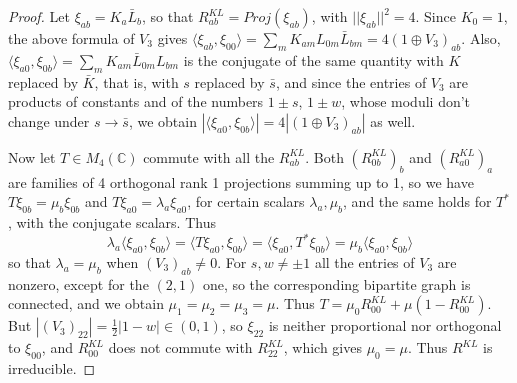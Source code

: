 \documentclass[11pt]{amsart}
\begin{document}
\begin{proof}
Let $\xi_{ab}=K_a\bar{L}_b$, so that $R^{KL}_{ab}=Proj(\xi_{ab})$, with $||\xi_{ab}||^2=4$. Since $K_0=1$, the above formula of $V_3$ gives $\langle\xi_{ab},\xi_{00}\rangle=\sum_mK_{am}L_{0m}\bar{L}_{bm}=4(1\oplus V_3)_{ab}$. Also, $\langle\xi_{a0},\xi_{0b}\rangle=\sum_mK_{am}\bar{L}_{0m}L_{bm}$ is the conjugate of the same quantity with $K$ replaced by $\bar{K}$, that is, with $s$ replaced by $\bar{s}$, and since the entries of $V_3$ are products of constants and of the numbers $1\pm s$, $1\pm w$, whose moduli don't change under $s\to\bar{s}$, we obtain $|\langle\xi_{a0},\xi_{0b}\rangle|=4|(1\oplus V_3)_{ab}|$ as well.

Now let $T\in M_4(\mathbb C)$ commute with all the $R^{KL}_{ab}$. Both $(R^{KL}_{0b})_b$ and $(R^{KL}_{a0})_a$ are families of 4 orthogonal rank 1 projections summing up to 1, so we have $T\xi_{0b}=\mu_b\xi_{0b}$ and $T\xi_{a0}=\lambda_a\xi_{a0}$, for certain scalars $\lambda_a,\mu_b$, and the same holds for $T^*$, with the conjugate scalars. Thus
$$\lambda_a\langle\xi_{a0},\xi_{0b}\rangle=\langle T\xi_{a0},\xi_{0b}\rangle=\langle\xi_{a0},T^*\xi_{0b}\rangle=\mu_b\langle\xi_{a0},\xi_{0b}\rangle$$
so that $\lambda_a=\mu_b$ when $(V_3)_{ab}\neq0$. For $s,w\neq\pm1$ all the entries of $V_3$ are nonzero, except for the $(2,1)$ one, so the corresponding bipartite graph is connected, and we obtain $\mu_1=\mu_2=\mu_3=\mu$. Thus $T=\mu_0R^{KL}_{00}+\mu(1-R^{KL}_{00})$. But $|(V_3)_{22}|=\frac{1}{2}|1-w|\in(0,1)$, so $\xi_{22}$ is neither proportional nor orthogonal to $\xi_{00}$, and $R^{KL}_{00}$ does not commute with $R^{KL}_{22}$, which gives $\mu_0=\mu$. Thus $R^{KL}$ is irreducible.


\end{proof}
\end{document}

